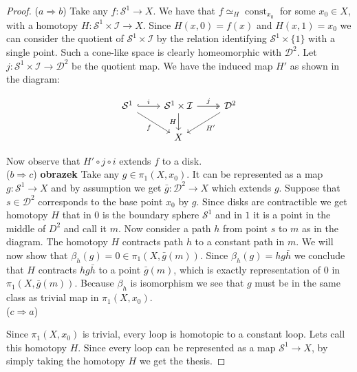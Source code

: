 \documentclass[11pt, a4paper, final]{amsart}
\newcommand\todo[1]{\textbf{\textcolor{redd}{#1}}}
\newcommand{\unit}{\mathcal{I}}
\newcommand{\sphere}{\mathcal{S}}
\newcommand{\disk}{\mathcal{D}}
\DeclareMathOperator{\const}{{const}}
\numberwithin{theorem}{section}
\theoremstyle{definition}
\theoremstyle{remark}
\begin{document}
\begin{proof} 
    ($a \Rightarrow b$) Take any $f : \sphere^1 \rightarrow X$. We have that $f \simeq_H \const_{x_0}$ for some $x_0 \in X$, with a homotopy $H: \sphere^1 \times \unit \rightarrow X$. Since $H(x, 0) = f(x)$ and $H(x, 1) = x_0$ we can consider the quotient of $\sphere^1 \times \unit$ by the relation identifying $\sphere^1 \times \{1\}$ with a single point. Such a cone-like space is clearly homeomorphic with $\disk^2$. Let $j : \sphere^1 \times \unit \rightarrow \disk^2$ be the quotient map. We have the induced map $H'$ as shown in the diagram:
    
    \[\begin{tikzcd}
	{\sphere^1} & {\sphere^1 \times \unit} & {\disk^2} \\
	& X
	\arrow["i", hook, from=1-1, to=1-2]
	\arrow["f"', from=1-1, to=2-2]
	\arrow["j", two heads, from=1-2, to=1-3]
	\arrow["H"', from=1-2, to=2-2]
	\arrow["{H'}", from=1-3, to=2-2]
    \end{tikzcd}\]

    Now observe that $H' \circ j \circ i$ extends $f$ to a disk. \\

    ($b \Rightarrow c$) \todo{obrazek} Take any $g \in \pi_1(X,x_0)$. It can be represented as a map $g : \sphere^1 \to X$ and by assumption we get $\bar{g} : \disk^2 \to X$ which extends $g$. Suppose that $s \in \disk^2$ corresponds to the base point $x_0$ by $g$. Since disks are contractible we get homotopy $H$ that in $0$ is the boundary sphere $\sphere^1$ and in $1$ it is a point in the middle of $D^2$ and call it $m$. Now consider a path $h$ from point $s$ to $m$ as in the diagram. The homotopy $H$ contracts path $h$ to a constant path in $m$. We will now show that $\beta_h(g) = 0 \in \pi_1(X,\bar{g}(m))$. Since $\beta_h(g) = hg\bar{h}$ we conclude that $H$ contracts $hg\bar{h}$ to a point $\bar{g}(m)$, which is exactly representation of $0$ in $\pi_1(X,\bar{g}(m))$. Because $\beta_h$ is isomorphism we see that $g$ must be in the same class as trivial map in $\pi_1(X,x_0)$. \\

    ($c \Rightarrow a$)

    Since $\pi_1(X,x_0)$ is trivial, every loop is homotopic to a constant loop. Lets call this homotopy $H$. Since every loop can be represented as a map $\sphere^1 \to X$, by simply taking the homotopy $H$ we get the thesis.
\end{proof}
\end{document}

